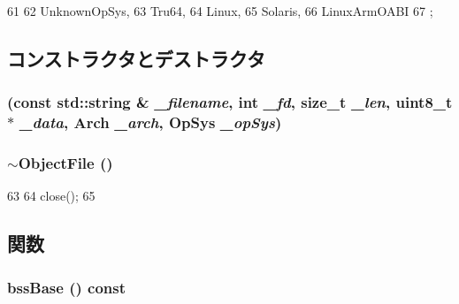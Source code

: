 \begin{DoxyCode}
61                {
62         UnknownOpSys,
63         Tru64,
64         Linux,
65         Solaris,
66         LinuxArmOABI
67     };
\end{DoxyCode}


\subsection{コンストラクタとデストラクタ}
\hypertarget{classObjectFile_a12e93d714650071eab585e1f54ba0348}{
\subsubsection[{ObjectFile}]{ (const std::string \& {\em \_\-filename}, \/  int {\em \_\-fd}, \/  size\_\-t {\em \_\-len}, \/  uint8\_\-t $\ast$ {\em \_\-data}, \/  {\bf Arch} {\em \_\-arch}, \/  {\bf OpSys} {\em \_\-opSys})}}
\label{classObjectFile_a12e93d714650071eab585e1f54ba0348}
\hypertarget{classObjectFile_a30c48e661f5edc3172278593aea73067}{
\subsubsection[{$\sim$ObjectFile}]{\setlength{\rightskip}{0pt plus 5cm}$\sim${\bf ObjectFile} ()}}
\label{classObjectFile_a30c48e661f5edc3172278593aea73067}



\begin{DoxyCode}
63 {
64     close();
65 }
\end{DoxyCode}


\subsection{関数}
\hypertarget{classObjectFile_a9aeb851c40011850f45b34cdd60aada9}{
\subsubsection[{bssBase}]{ bssBase () const}}
\label{classObjectFile_a9aeb851c40011850f45b34cdd60aada9}



